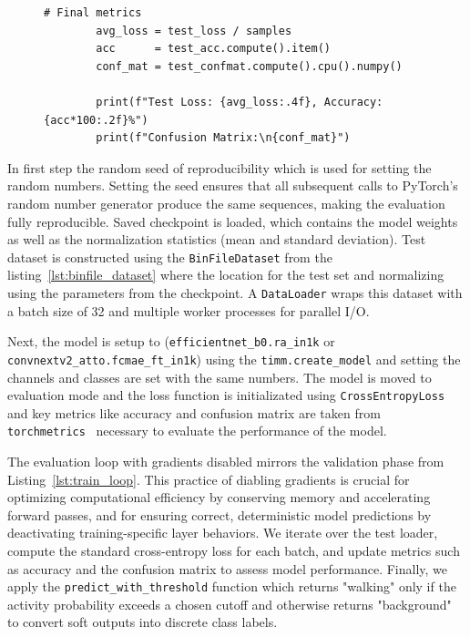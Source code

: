 \begin{figure}[htbp]
\begin{minipage}{\linewidth}
\begin{lstlisting}[style=pythonstyle, caption={Model test script}, label=lst:test_loop]
        # Final metrics
        avg_loss = test_loss / samples
        acc      = test_acc.compute().item()
        conf_mat = test_confmat.compute().cpu().numpy()
        
        print(f"Test Loss: {avg_loss:.4f}, Accuracy: {acc*100:.2f}%")
        print(f"Confusion Matrix:\n{conf_mat}")
    \end{lstlisting}
  \end{minipage}
\end{figure}
    
In first step the random seed of reproducibility which is used for setting the random numbers. Setting the seed ensures that all subsequent calls to PyTorch's random number generator produce the same sequences, making the evaluation fully reproducible. Saved checkpoint is loaded, which contains the model weights as well as the normalization statistics (mean and standard deviation). Test dataset is constructed using the \texttt{BinFileDataset} from the listing~\ref{lst:binfile_dataset} where the location for the test set and normalizing using the parameters from the checkpoint. A \texttt{DataLoader} wraps this dataset with a batch size of 32 and multiple worker processes for parallel I/O. 

Next, the model is setup to (\texttt{efficientnet\_b0.ra\_in1k} or \texttt{convnextv2\allowbreak\_atto.fcmae\_ft\_in1k}) using the \texttt{timm.create\_model} and setting the channels and classes are set with the same numbers. The model is moved to evaluation mode and the loss function is initializated using \texttt{CrossEntropyLoss} and key metrics like accuracy and confusion matrix are taken from \texttt{torchmetrics}~ \cite{torchmetrics} necessary to evaluate the performance of the model.

The evaluation loop with gradients disabled mirrors the validation phase from Listing~\ref{lst:train_loop}. This practice of diabling gradients is crucial for optimizing computational efficiency by conserving memory and accelerating forward passes, and for ensuring correct, deterministic model predictions by deactivating training-specific layer behaviors. We iterate over the test loader, compute the standard cross-entropy loss for each batch, and update metrics such as accuracy and the confusion matrix to assess model performance.  Finally, we apply the \texttt{predict\_with\_threshold} function which returns "walking" only if the activity probability exceeds a chosen cutoff and otherwise returns "background" to convert soft outputs into discrete class labels.

